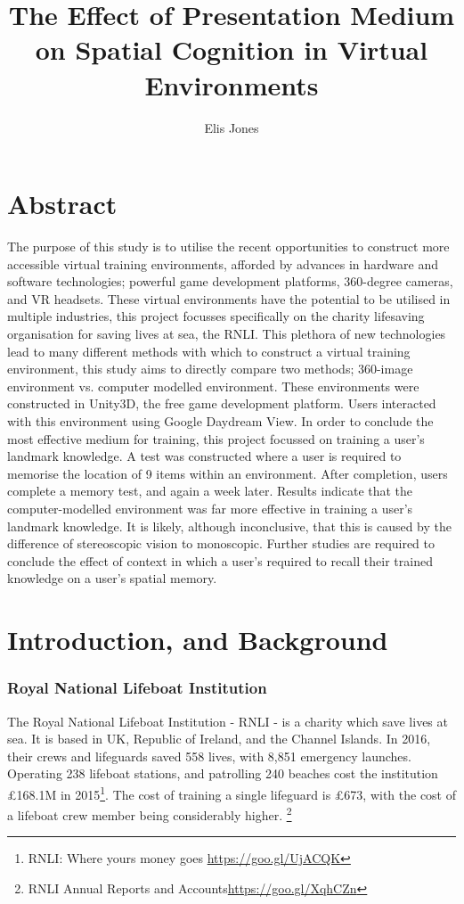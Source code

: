 \documentclass[a4paper, openright, twoside]{book}
\date{}
\title{The Effect of Presentation Medium on Spatial Cognition in Virtual Environments}
\author{Elis Jones}
\begin{document}
\maketitle
\frontmatter
\tableofcontents{}

\chapter*{Abstract}
The purpose of this study is to utilise the recent opportunities to construct more accessible virtual training environments, afforded by advances in hardware and software technologies; powerful game development platforms, 360-degree cameras, and VR headsets. These virtual environments have the potential to be utilised in multiple industries, this project focusses specifically on the charity lifesaving organisation for saving lives at sea, the RNLI. This plethora of new technologies lead to many different methods with which to construct a virtual training environment, this study aims to directly compare two methods; 360-image environment vs. computer modelled environment. These environments were constructed in Unity3D, the free game development platform. Users interacted with this environment using Google Daydream View. In order to conclude the most effective medium for training, this project focussed on training a user's landmark knowledge. A test was constructed where a user is required to memorise the location of 9 items within an environment. After completion, users complete a memory test, and again a week later. Results indicate that the computer-modelled environment was far more effective in training a user's landmark knowledge. It is likely, although inconclusive, that this is caused by the difference of stereoscopic vision to monoscopic. Further studies are required to conclude the effect of context in which a user's required to recall their trained knowledge on a user's spatial memory.  

\mainmatter
\chapter{Introduction, and Background}\label{intro_chapter}

\subsection{Royal National Lifeboat Institution}
The Royal National Lifeboat Institution - RNLI - is a charity which save lives at sea. It is based in UK, Republic of Ireland, and the Channel Islands. In 2016, their crews and lifeguards saved 558 lives, with 8,851 emergency launches. Operating 238 lifeboat stations, and patrolling 240 beaches cost the institution £168.1M in 2015\footnote{RNLI: Where yours money goes \url{https://goo.gl/UjACQK}}. The cost of training a single lifeguard is £673, with the cost of a lifeboat crew member being considerably higher. \footnote{ RNLI Annual Reports and Accounts\url{https://goo.gl/XqhCZn}} 
\end{document}

